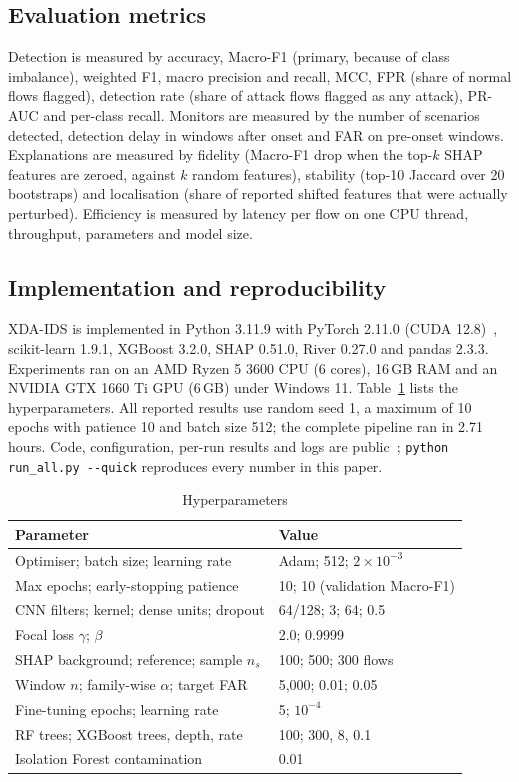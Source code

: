 \documentclass[conference]{IEEEtran}
\begin{document}
\subsection{Evaluation metrics}
Detection is measured by accuracy, Macro-F1 (primary, because of class imbalance), weighted F1, macro precision and recall, MCC, FPR (share of normal flows flagged), detection rate (share of attack flows flagged as any attack), PR-AUC and per-class recall. Monitors are measured by the number of scenarios detected, detection delay in windows after onset and FAR on pre-onset windows. Explanations are measured by fidelity (Macro-F1 drop when the top-$k$ SHAP features are zeroed, against $k$ random features), stability (top-10 Jaccard over 20 bootstraps) and localisation (share of reported shifted features that were actually perturbed). Efficiency is measured by latency per flow on one CPU thread, throughput, parameters and model size.

\subsection{Implementation and reproducibility}
XDA-IDS is implemented in Python 3.11.9 with PyTorch 2.11.0 (CUDA 12.8)~\cite{paszke2019}, scikit-learn 1.9.1, XGBoost 3.2.0, SHAP 0.51.0, River 0.27.0 and pandas 2.3.3. Experiments ran on an AMD Ryzen 5 3600 CPU (6 cores), 16\,GB RAM and an NVIDIA GTX 1660 Ti GPU (6\,GB) under Windows 11. Table~\ref{tab:hyper} lists the hyperparameters. All reported results use random seed 1, a maximum of 10 epochs with patience 10 and batch size 512; the complete pipeline ran in 2.71 hours. Code, configuration, per-run results and logs are public~\cite{repo}; \texttt{python run\_all.py -{}-quick} reproduces every number in this paper.

\begin{table}[t]
\caption{Hyperparameters}
\label{tab:hyper}
\centering\footnotesize
\begin{tabular}{@{}ll@{}}
\toprule
Parameter & Value \\
\midrule
Optimiser; batch size; learning rate & Adam; 512; $2\times10^{-3}$ \\
Max epochs; early-stopping patience & 10; 10 (validation Macro-F1) \\
CNN filters; kernel; dense units; dropout & 64/128; 3; 64; 0.5 \\
Focal loss $\gamma$; $\beta$ & 2.0; 0.9999 \\
SHAP background; reference; sample $n_s$ & 100; 500; 300 flows \\
Window $n$; family-wise $\alpha$; target FAR & 5{,}000; 0.01; 0.05 \\
Fine-tuning epochs; learning rate & 5; $10^{-4}$ \\
RF trees; XGBoost trees, depth, rate & 100; 300, 8, 0.1 \\
Isolation Forest contamination & 0.01 \\
\bottomrule
\end{tabular}
\end{table}
\end{document}
